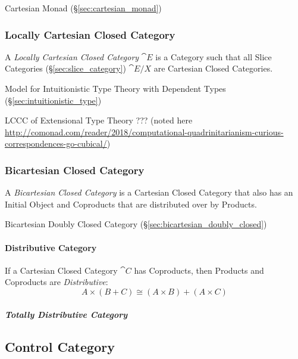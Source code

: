 Cartesian Monad (\S\ref{sec:cartesian_monad})



\subsubsection{Locally Cartesian Closed Category}
\label{sec:locally_cartesian_closed}

A \emph{Locally Cartesian Closed Category} $\cat{E}$ is a Category
such that all Slice Categories (\S\ref{sec:slice_category})
$\cat{E}/X$ are Cartesian Closed Categories.

Model for Intuitionistic Type Theory with Dependent Types
(\S\ref{sec:intuitionistic_type})

LCCC of Extensional Type Theory ??? (noted here
\url{http://comonad.com/reader/2018/computational-quadrinitarianism-curious-correspondences-go-cubical/})



\subsubsection{Bicartesian Closed Category}\label{sec:bicartesian}

A \emph{Bicartesian Closed Category} is a Cartesian Closed Category
that also has an Initial Object and Coproducts that are distributed
over by Products.

\fist Bicartesian Doubly Closed Category
(\S\ref{sec:bicartesian_doubly_closed})



\paragraph{Distributive Category}\label{sec:distributive_category}\hfill

If a Cartesian Closed Category $\cat{C}$ has Coproducts, then
Products and Coproducts are \emph{Distributive}:\cite{awodey06}
\[
  A \times (B + C) \cong (A \times B) + (A \times C)
\]



\subparagraph{Totally Distributive Category}\hfill
\label{sec:totally_distributive_category}



\subsection{Control Category}\label{sec:control_category}

